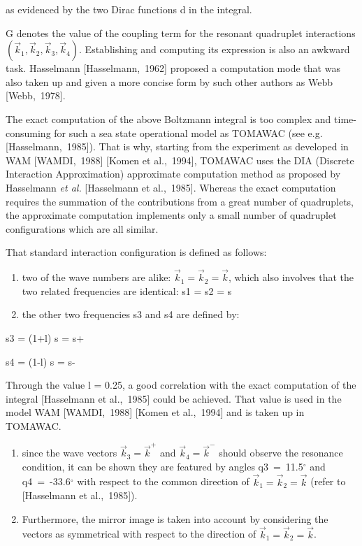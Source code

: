  as evidenced by the two Dirac functions d in the integral.

 G denotes the value of the coupling term for the resonant quadruplet interactions$\left(\vec{k}_{1} ,\vec{k}_{2} ,\vec{k}_{3} ,\vec{k}_{4} \right)$. Establishing and computing its expression is also an awkward task. Hasselmann [Hasselmann,~1962] proposed a computation mode that was also taken up and given a more concise form by such other authors as Webb [Webb,~1978].

 The exact computation of the above Boltzmann integral is too complex and time-consuming for such a sea state operational model as TOMAWAC (see e.g. [Hasselmann,~1985]). That is why, starting from the experiment as developed in WAM [WAMDI,~1988] [Komen et al.,~1994], TOMAWAC uses the DIA (Discrete Interaction Approximation) approximate computation method as proposed by Hasselmann \textit{et al.} [Hasselmann et al.,~1985]. Whereas the exact computation requires the summation of the contributions from a great number of quadruplets, the approximate computation implements only a small number of quadruplet configurations which are all similar.

 That standard interaction configuration is defined as follows:

\begin{enumerate}
\item  two of the wave numbers are alike: $\vec{k}_{1} =\vec{k}_{2} =\vec{k}$, which also involves that the two related frequencies are identical: s1 = s2 = s

\item  the other two frequencies s3 and s4 are defined by:
\end{enumerate}

  s3 = (1+l) s = s+

  s4 = (1-l) s = s-

 Through the value l = 0.25, a good correlation with the exact computation of the integral [Hasselmann et al.,~1985] could be achieved. That value is used in the model WAM [WAMDI,~1988] [Komen et al.,~1994] and is taken up in TOMAWAC.

\begin{enumerate}
\item  since the wave vectors $\vec{k}_{3} =\vec{k}^{+} $ and $\vec{k}_{4} =\vec{k}^{-} $ should observe the resonance condition, it can be shown they are featured by angles q3~=~11.5${}^\circ$ and q4~=~-33.6${}^\circ$ with respect to the common direction of $\vec{k}_{1} =\vec{k}_{2} =\vec{k}$ (refer to [Hasselmann et al.,~1985]).

\item  Furthermore, the mirror image is taken into account by considering the vectors as symmetrical with respect to the direction of $\vec{k}_{1} =\vec{k}_{2} =\vec{k}$.
\end{enumerate}

